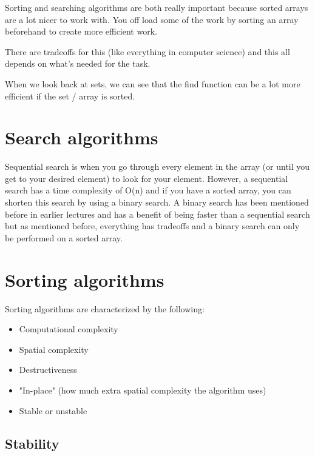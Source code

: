 \documentclass[11pt,a4paper,english]{report}
\begin{document}
Sorting and searching algorithms are both really important because sorted arrays are a lot nicer to work with. You off load some of the work by sorting an array beforehand to create more efficient work. 

There are tradeoffs for this (like everything in computer science) and this all depends on what's needed for the task.

When we look back at sets, we can see that the find function can be a lot more efficient if the set / array is sorted. 


\section{Search algorithms}

Sequential search is when you go through every element in the array (or until you get to your desired element) to look for your element. However, a sequential search has a time complexity of O(n) and if you have a sorted array, you can shorten this search by using a binary search. A binary search has been mentioned before in earlier lectures and has a benefit of being faster than a sequential search but as mentioned before, everything has tradeoffs and a binary search can only be performed on a sorted array.


\section{Sorting algorithms}

Sorting algorithms are characterized by the following:

\begin{bluebox}{}{
\begin{itemize}

  \item Computational complexity
  \item Spatial complexity
  \item Destructiveness
  \item "In-place" (how much extra spatial complexity the algorithm uses)
  \item Stable or unstable

\end{itemize}
}\end{bluebox}

\subsection{Stability}
\end{document}
